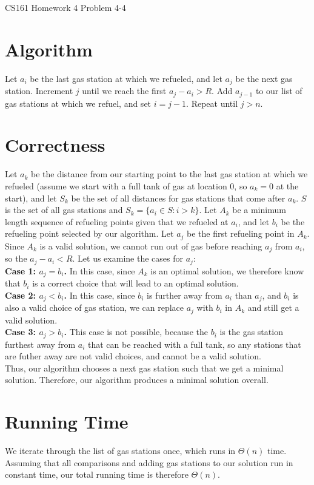 \documentclass[12pt]{article}
\begin{document}
\begin{center}
{\Large CS161 Homework 4 Problem 4-4}

\end{center}

\section*{Algorithm}
Let $a_i$ be the last gas station at which we refueled, and let $a_j$ be the next gas station. Increment $j$ until we reach the first $a_j - a_i > R$. Add $a_{j-1}$ to our list of gas stations at which we refuel, and set $i = j-1$. Repeat until $j > n$.

\section*{Correctness}
Let $a_k$ be the distance from our starting point to the last gas station at which we refueled (assume we start with a full tank of gas at location 0, so $a_k = 0$ at the start), and let $S_k$ be the set of all distances for gas stations that come after $a_k$. $S$ is the set of all gas stations and $S_k = \{a_i \in S : i > k\}$. Let $A_k$ be a minimum length sequence of refueling points given that we refueled at $a_i$, and let $b_i$ be the refueling point selected by our algorithm. Let $a_j$ be the first refueling point in $A_k$. Since $A_k$ is a valid solution, we cannot run out of gas before reaching $a_j$ from $a_i$, so the $a_j - a_i < R$. Let us examine the cases for $a_j$:\\
\textbf{Case 1: $a_j = b_i$.} In this case, since $A_k$ is an optimal solution, we therefore know that $b_i$ is a correct choice that will lead to an optimal solution.\\
\textbf{Case 2: $a_j < b_i$.} In this case, since $b_i$ is further away from $a_i$ than $a_j$, and $b_i$ is also a valid choice of gas station, we can replace $a_j$ with $b_i$ in $A_k$ and still get a valid solution.\\
\textbf{Case 3: $a_j > b_i$.} This case is not possible, because the $b_i$ is the gas station furthest away from $a_i$ that can be reached with a full tank, so any stations that are futher away are not valid choices, and cannot be a valid solution.\\
Thus, our algorithm chooses a next gas station such that we get a minimal solution. Therefore, our algorithm produces a minimal solution overall.

\section*{Running Time}
We iterate through the list of gas stations once, which runs in $\Theta(n)$ time. Assuming that all comparisons and adding gas stations to our solution run in constant time, our total running time is therefore $\Theta(n)$.
\end{document}
